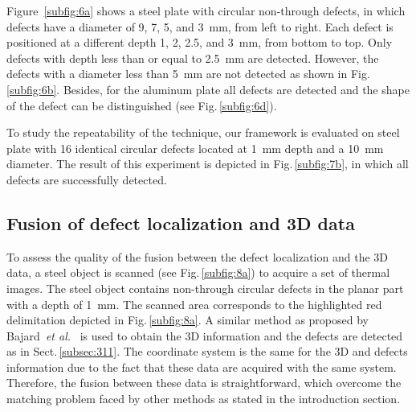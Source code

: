 \documentclass[12pt]{spieman}
\begin{document}
\begin{spacing}{2}
Figure~\ref{subfig:6a} shows a steel plate with circular non-through defects, in which defects have a diameter of 9, 7, 5, and \SI{3}{\milli \metre}, from left to right. 
Each defect is positioned at a different depth 1, 2, 2.5, and \SI{3}{\milli \metre}, from bottom to top. 
Only defects with depth less than or equal to \SI{2.5}{\milli \metre} are detected. 
However, the defects with a diameter less than \SI{5}{\milli \metre} are not detected as shown in Fig.\,\ref{subfig:6b}.
Besides, for the aluminum plate all defects are detected and the shape of the defect can be distinguished (see Fig.\,\ref{subfig:6d}). 

 

To study the repeatability of the technique, our framework is evaluated on steel plate with 16 identical circular defects located at \SI{1}{\milli \metre} depth and a \SI{10}{\milli \metre} diameter. 
The result of this experiment is depicted in Fig.\,\ref{subfig:7b}, in which all defects are successfully detected.



\subsection{Fusion of defect localization and 3D data}

To assess the quality of the fusion between the defect localization and the 3D data, a steel object is scanned (see Fig.\,\ref{subfig:8a}) to acquire a set of thermal images.
The steel object contains non-through circular defects in the planar part with a depth of \SI{1}{\milli \metre}.
The scanned area corresponds to the highlighted red delimitation depicted in Fig.\,\ref{subfig:8a}.
A similar method as proposed by Bajard~\emph{et al.}~\cite{Bajard2012} is used to obtain the 3D information and the defects are detected as in Sect.\,\ref{subsec:311}.
The coordinate system is the same for the 3D and defects information due to the fact that these data are acquired with the same system.
Therefore, the fusion between these data is straightforward, which overcome the matching problem faced by other methods as stated in the introduction section.


\end{spacing}
\end{document}
